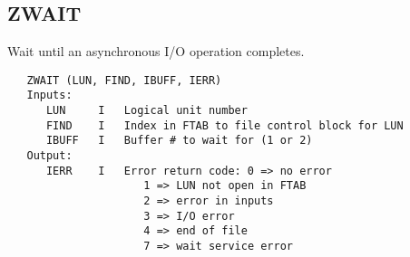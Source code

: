 \subsection{ZWAIT}
Wait until an asynchronous I/O operation completes.
\begin{verbatim}
   ZWAIT (LUN, FIND, IBUFF, IERR)
   Inputs:
      LUN     I   Logical unit number
      FIND    I   Index in FTAB to file control block for LUN
      IBUFF   I   Buffer # to wait for (1 or 2)
   Output:
      IERR    I   Error return code: 0 => no error
                     1 => LUN not open in FTAB
                     2 => error in inputs
                     3 => I/O error
                     4 => end of file
                     7 => wait service error
\end{verbatim}

